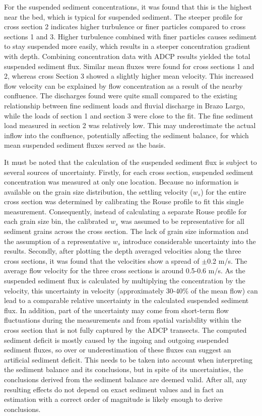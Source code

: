For the suspended sediment concentrations, it was found that this is the highest near the bed, which is typical for suspended sediment. The steeper profile for cross section 2 indicates higher turbulence or finer particles compared to cross sections 1 and 3. Higher turbulence combined with finer particles causes sediment to stay suspended more easily, which results in a steeper concentration gradient with depth. Combining concentration data with ADCP results yielded the total suspended sediment flux. Similar mean fluxes were found for cross sections 1 and 2, whereas cross Section 3 showed a slightly higher mean velocity. This increased flow velocity can be explained by flow concentration as a result of the nearby confluence. The discharges found were quite small compared to the existing relationship between fine sediment loads and fluvial discharge in Brazo Largo, while the loads of section 1 and section 3 were close to the fit. The fine sediment load measured in section 2 was relatively low. This may underestimate the actual inflow into the confluence, potentially affecting the sediment balance, for which mean suspended sediment fluxes served as the basis.

It must be noted that the calculation of the suspended sediment flux is subject to several sources of uncertainty. Firstly, for each cross section, suspended sediment concentration was measured at only one location. Because no information is available on the grain size distribution, the settling velocity ($w_s$) for the entire cross section was determined by calibrating the Rouse profile to fit this single measurement. Consequently, instead of calculating a separate Rouse profile for each grain size bin, the calibrated $w_s$ was assumed to be representative for all sediment grains across the cross section. The lack of grain size information and the assumption of a representative $w_s$ introduce considerable uncertainty into the results. Secondly, after plotting the depth averaged velocities along the three cross sections, it was found that the velocities show a spread of $\pm$0.2 m/s. The average flow velocity for the three cross sections is around 0.5-0.6 m/s. As the suspended sediment flux is calculated by multiplying the concentration by the velocity, this uncertainty in velocity (approximately  30-40\% of the mean flow) can lead to a comparable relative uncertainty in the calculated suspended sediment flux. In addition, part of the uncertainty may come from short-term flow fluctuations during the measurements and from spatial variability within the cross section that is not fully captured by the ADCP transects. The computed sediment deficit is mostly caused by the ingoing and outgoing suspended sediment fluxes, so over or underestimation of these fluxes can suggest an artificial sediment deficit. This needs to be taken into account when interpreting the sediment balance and its conclusions, but in spite of its uncertainties, the conclusions derived from the sediment balance are deemed valid. After all, any resulting effects do not depend on exact sediment values and in fact an estimation with a correct order of magnitude is likely enough to derive conclusions. 

